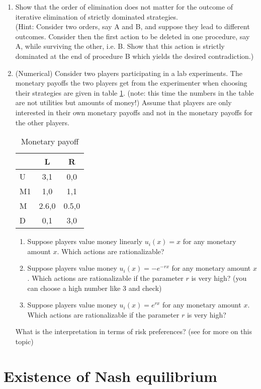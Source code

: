 \documentclass[a4paper,12pt]{article}
\begin{document}
\begin{enumerate}
\item Show that the order of elimination does not matter for the outcome of iterative elimination of strictly dominated strategies. \\(Hint: Consider two orders, say A and B, and suppose they lead to different outcomes. Consider then the first action to be deleted in one procedure, say A, while surviving the other, i.e. B. Show that this action is strictly dominated at the end of procedure B which yields the desired contradiction.)
\item (Numerical) Consider two players participating in a lab experiments. The monetary payoffs the two players get from the experimenter when choosing their strategies are given in table \ref{tab:monRatio}. (note: this time the numbers in the table are not utilities but amounts of money!) Assume that players are only interested in their own monetary payoffs and not in the monetary payoffs for the other players.
  \begin{table}[h]
    \centering
    \begin{tabular}{l|c|c}
      & L &R\\ \hline
      U& 3,1  &0,0  \\
      M1&1,0&1,1 \\
      M&2.6,0  &0.5,0 \\
      D& 0,1 & 3,0
    \end{tabular}
    \caption{Monetary payoff}
    \label{tab:monRatio}
  \end{table}
  \begin{enumerate}
  \item Suppose players value money linearly $u_i(x)=x$ for any monetary amount $x$. Which actions are rationalizable?
  \item Suppose players value money  $u_i(x)=-e^{-r x}$ for any monetary amount $x$. Which actions are rationalizable if the parameter $r$ is very high? (you can choose a high number like $3$ and check)
     \item Suppose players value money $u_i(x)=e^{r x}$ for any monetary amount $x$. Which actions are rationalizable if the parameter $r$ is very high?
     \end{enumerate}
     What is the interpretation in terms of risk preferences? (see \cite{weinstein2016effect} for more on this topic)
\end{enumerate}


\section{Existence of Nash equilibrium}
\label{sec:nash-theorem-fixed}
\end{document}
